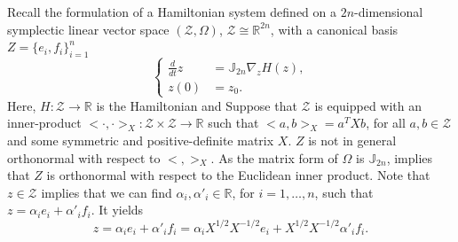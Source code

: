Recall the formulation of a Hamiltonian system defined on a $2n$-dimensional symplectic linear vector space $(\mathcal Z,\Omega )$, $\mathcal Z \cong \mathbb R^{2n}$, with a canonical basis $Z = \{ e_i , f_i \}_{i=1}^{n}$
\begin{equation} \label{p1.eq:nommor.0}
	\left\{
	\begin{aligned}
		\frac d {dt} z &= \mathbb J_{2n} \nabla_z H(z), \\
		z(0) &= z_0.
	\end{aligned}
	\right.
\end{equation}
Here, $H: \mathcal Z \to \mathbb R$ is the Hamiltonian and  Suppose that $\mathcal Z$ is equipped with an inner-product $<\cdot,\cdot>_X : \mathcal Z \times \mathcal Z \to \mathbb R$ such that $<a,b>_X = a^TXb$, for all $a,b\in\mathcal Z$ and some symmetric and positive-definite matrix $X$. $Z$ is not in general orthonormal with respect to $<,>_X$. As the matrix form of $\Omega$ is $\mathbb J_{2n}$,  implies that $Z$ is orthonormal with respect to the Euclidean inner product. Note that $z\in \mathcal Z$ implies that we can find $\alpha_i,\alpha'_i \in \mathbb R$, for $i=1,\dots,n$, such that $z = \alpha_i e_i + \alpha'_i f_i$. It yields
\begin{equation}
	z = \alpha_i e_i + \alpha'_i f_i = \alpha_i X^{1/2} X^{-1/2}e_i + X^{1/2} X^{-1/2} \alpha'_i f_i.
\end{equation}
